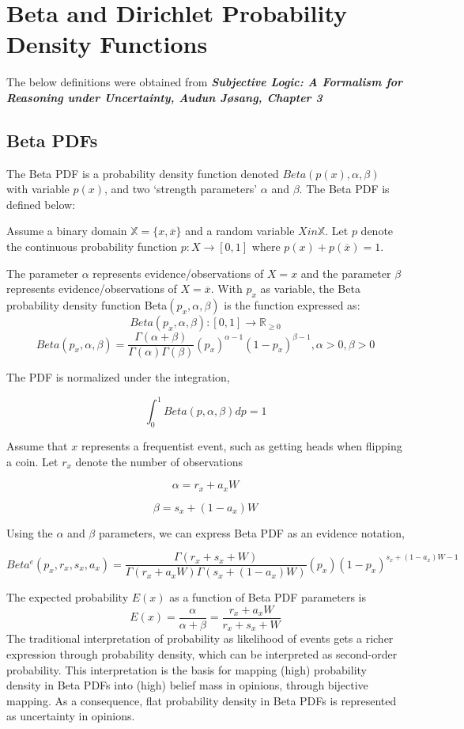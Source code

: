 \documentclass[UTF8]{article}
\newcommand{\mycite}[1]{\textbf{\textit{#1}}}
\begin{document}
\section{Beta and Dirichlet Probability Density Functions}
The below definitions were obtained from \mycite{Subjective Logic: A Formalism for Reasoning under Uncertainty, Audun Jøsang, Chapter 3}
\subsection{Beta PDFs}
The Beta PDF is a probability density function denoted $Beta(p(x),\alpha,\beta)$ with variable $p(x)$, and two ‘strength parameters’ $\alpha$ and $\beta$. The Beta PDF is defined below:

Assume a binary domain $\mathbb{X} = \{x, \overline{x}\}$ and a random variable $X in \mathbb{X}$. Let $p$ denote the continuous probability function $p : X \rightarrow [0,1]$ where $p(x) + p(\overline{x}) = 1$.

The parameter $\alpha$ represents evidence/observations of $X = x$ and the parameter $\beta$ represents evidence/observations of $X = \overline{x}$. With $p_x$ as variable, the Beta probability density function Beta$(p_x, \alpha, \beta)$ is the function expressed as:
$$ 
    Beta(p_x, \alpha, \beta) : [0, 1] \rightarrow \mathbb{R}_{\geq 0}
$$
$$
    Beta(p_x, \alpha, \beta) = \frac{\Gamma(\alpha + \beta)}{\Gamma(\alpha) \Gamma(\beta)} \left(p_x\right)^{\alpha - 1}\left(1 - p_x\right)^{\beta - 1}, \alpha > 0, \beta > 0
$$

The PDF is normalized under the integration,

$$\int_{0}^{1} Beta(p, \alpha, \beta)dp = 1$$

Assume that $x$ represents a frequentist event, such as getting heads when flipping a coin. Let $r_x$ denote the number of observations 

$$\alpha = r_x +  a_xW$$

$$\beta = s_x + (1 - a_x)W$$    

Using the $\alpha$ and $\beta$ parameters, we can express Beta PDF as an evidence notation,

$$
Beta^e(p_x, r_x, s_x, a_x) = \frac{\Gamma(r_x + s_x + W)}{\Gamma(r_x + a_xW) \Gamma(s_x + (1 - a_x)W)}\left(p_x\right)\left(1 - p_x\right)^{s_x + (1 - a_x)W - 1}
$$

The expected probability $E(x)$ as a function of Beta PDF parameters is 
$$
E(x) = \frac{\alpha}{\alpha + \beta} = \frac{r_x + a_xW}{r_x + s_x + W}
$$
The traditional interpretation of probability
as likelihood of events gets a richer expression through probability density, which
can be interpreted as second-order probability. This interpretation is the basis for
mapping (high) probability density in Beta PDFs into (high) belief mass in opinions, through bijective mapping. As a consequence, flat probability density in Beta PDFs is represented as uncertainty in opinions.
\end{document}
